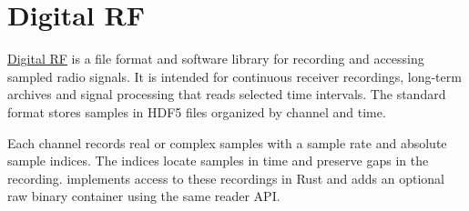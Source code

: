 \documentclass[10pt,a4paper]{article}
\newcommand{\api}[1]{\texttt{\detokenize{#1}}}
\begin{document}
\section*{Digital RF}
\href{https://github.com/MITHaystack/digital_rf}{Digital RF} is a file format
and software library for recording and accessing sampled radio signals. It is
intended for continuous receiver recordings, long-term archives and signal
processing that reads selected time intervals. The standard format stores
samples in HDF5 files organized by channel and time.

Each channel records real or complex samples with a sample rate and absolute
sample indices. The indices locate samples in time and preserve gaps in the
recording. \api{rdigital_rf} implements access to these recordings in Rust and
adds an optional raw binary container using the same reader API.
\end{document}
